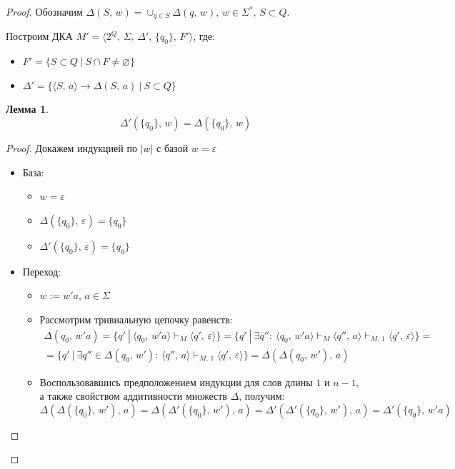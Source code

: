 \documentclass[a4paper,12pt]{article}
\renewcommand{\emptyset}{\ensuremath{\varnothing}}
\theoremstyle{plain}
\newtheorem{lemma}{Лемма}[subsection]
\theoremstyle{definition}
\theoremstyle{remark}
\begin{document}
\begin{proof}
	Обозначим $\Delta(S,\, w) = \cup_{q \in S} \Delta(q,\, w),\, w \in \Sigma^*,\, S \subset Q$.

	Построим ДКА $M' = \langle 2^Q,\,\Sigma,\, \Delta',\, \{q_0\},\, F' \rangle$, где:
	\begin{itemize}
		\item $F' = \{S \subset Q \:|\: S \cap F \neq \emptyset\}$
		\item $\Delta' = \{\langle S,\, a\rangle \to \Delta(S,\, a) \:|\: S \subset Q\}$
	\end{itemize}

	\begin{lemma}
		\[\Delta'(\{q_0\},\, w) = \Delta(\{q_0\},\, w)\]
	\end{lemma}
	\begin{proof}
		Докажем индукцией по $|w|$ с базой $w = \varepsilon$

		\begin{itemize}
			\item База:
			      \begin{itemize}
				      \item $w = \varepsilon$
				      \item $\Delta(\{q_0\},\, \varepsilon) = \{q_0\}$
				      \item $\Delta'(\{q_0\},\, \varepsilon) = \{q_0\}$
			      \end{itemize}
			\item Переход:
			      \begin{itemize}
				      \item $w := w'a,\, a \in \Sigma$
				      \item Рассмотрим тривиальную цепочку равенств:
				            \begin{align*}
					            \Delta(q_0,\, w'a) = \{q' \:|\: \langle q_0,\, w'a\rangle \vdash_M \langle q',\, \varepsilon\rangle\} = \{q' \:|\: \exists q'' :\: \langle q_0,\, w'a\rangle \vdash_M \langle q'',\, a\rangle \vdash_{M,\, 1} \langle q',\, \varepsilon\rangle\} = \\
					            = \{q' \:|\: \exists q'' \in \Delta(q_0,\, w') :\: \langle q'',\, a\rangle \vdash_{M,\, 1} \langle q',\, \varepsilon\rangle\} = \Delta(\Delta(q_0,\, w'),\, a)
				            \end{align*}
				      \item Воспользовавшись предположением индукции для слов длины $1$ и $n - 1$, а также свойством аддитивности множеств $\Delta$, получим:
				            \[
					            \Delta(\Delta(\{q_0\},\, w'),\, a) = \Delta(\Delta'(\{q_0\},\, w'),\, a) = \Delta'(\Delta'(\{q_0\},\, w'),\, a) = \Delta'(\{q_0\},\, w'a)
				            \]
			      \end{itemize}
		\end{itemize}
	\end{proof}


\end{proof}
\end{document}
